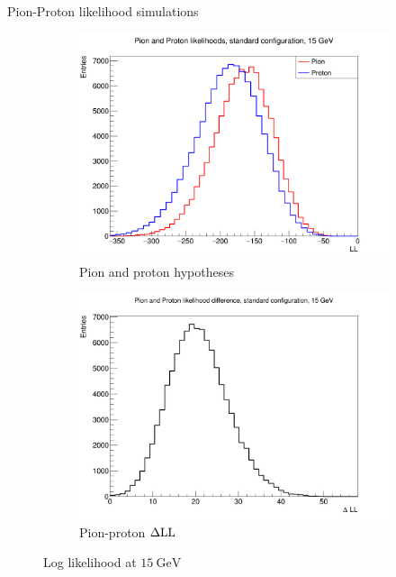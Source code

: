 \documentclass{beamer}
\begin{document}
\begin{frame}{Pion-Proton likelihood simulations}
  \begin{figure}
    \centering
    \vspace{-0.2cm}
    \begin{subfigure}{0.5\textwidth}
      \includegraphics[width = 1.0\textwidth]{Plots/ProtonPionLL15GeVStandard.png}
      \caption{Pion and proton hypotheses}
    \end{subfigure}%
    \begin{subfigure}{0.5\textwidth}
      \includegraphics[width = 1.0\textwidth]{Plots/ProtonPionDLL15GeVStandard.png}
      \caption{Pion-proton $\Delta{\rm LL}$}
    \end{subfigure}
    \caption{Log likelihood at $\SI{15}{\giga\eV}$}
  \end{figure}
\end{frame}
\end{document}
